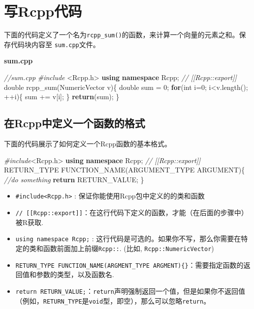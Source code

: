 \documentclass[]{ctexbook}
\newenvironment{Shaded}{\begin{snugshade}}{\end{snugshade}}
\newcommand{\KeywordTok}[1]{\textcolor[rgb]{0.13,0.29,0.53}{\textbf{#1}}}
\newcommand{\DataTypeTok}[1]{\textcolor[rgb]{0.13,0.29,0.53}{#1}}
\newcommand{\DecValTok}[1]{\textcolor[rgb]{0.00,0.00,0.81}{#1}}
\newcommand{\ImportTok}[1]{#1}
\newcommand{\CommentTok}[1]{\textcolor[rgb]{0.56,0.35,0.01}{\textit{#1}}}
\newcommand{\ControlFlowTok}[1]{\textcolor[rgb]{0.13,0.29,0.53}{\textbf{#1}}}
\newcommand{\PreprocessorTok}[1]{\textcolor[rgb]{0.56,0.35,0.01}{\textit{#1}}}
\newcommand{\NormalTok}[1]{#1}
\begin{document}
\section{写Rcpp代码}\label{WriteRcppCode}

下面的代码定义了一个名为\texttt{rcpp\_sum()}的函数，来计算一个向量的元素之和。保存代码块内容至
\texttt{sum.cpp}文件。

\textbf{sum.cpp}

\begin{Shaded}
\begin{Highlighting}[]
\CommentTok{//sum.cpp}
\PreprocessorTok{#include }\ImportTok{<Rcpp.h>}
\KeywordTok{using} \KeywordTok{namespace}\NormalTok{ Rcpp;}
\CommentTok{// [[Rcpp::export]]}
\DataTypeTok{double}\NormalTok{ rcpp_sum(NumericVector v)\{}
    \DataTypeTok{double}\NormalTok{ sum = }\DecValTok{0}\NormalTok{;}
    \ControlFlowTok{for}\NormalTok{(}\DataTypeTok{int}\NormalTok{ i=}\DecValTok{0}\NormalTok{; i<v.length(); ++i)\{}
\NormalTok{        sum += v[i];}
\NormalTok{    \}}
    \ControlFlowTok{return}\NormalTok{(sum);}
\NormalTok{\}}
\end{Highlighting}
\end{Shaded}

\subsection{在Rcpp中定义一个函数的格式}\label{formatForFunction}

下面的代码展示了如何定义一个Rcpp函数的基本格式。

\begin{Shaded}
\begin{Highlighting}[]
\PreprocessorTok{#include}\ImportTok{<Rcpp.h>}
\KeywordTok{using} \KeywordTok{namespace}\NormalTok{ Rcpp;}
\CommentTok{// [[Rcpp::export]]}
\NormalTok{RETURN_TYPE FUNCTION_NAME(ARGUMENT_TYPE ARGUMENT)\{}
    \CommentTok{//do something}
    \ControlFlowTok{return}\NormalTok{ RETURN_VALUE;}
\NormalTok{\}}
\end{Highlighting}
\end{Shaded}

\begin{itemize}
\item
  \texttt{\#include\textless{}Rcpp.h\textgreater{}} :
  保证你能使用Rcpp包中定义的的类和函数
\item
  \texttt{//\ {[}{[}Rcpp::export{]}{]}}：在这行代码下定义的函数，才能（在后面的步骤中）被R获取.
\item
  \texttt{using\ namespace\ Rcpp;} :
  这行代码是可选的。如果你不写，那么你需要在特定的类和函数前面加上前缀\texttt{Rcpp::}.
  (比如, \texttt{Rcpp::NumericVector})
\item
  \texttt{RETURN\_TYPE\ FUNCTION\_NAME(ARGMENT\_TYPE\ ARGMENT)\{\}}：需要指定函数的返回值和参数的类型，以及函数名.
\item
  \texttt{return\ RETURN\_VALUE;}：\texttt{return}声明强制返回一个值，但是如果你不返回值（例如，\texttt{RETURN\_TYPE}是\texttt{void}型，即空），那么可以忽略\texttt{return}。
\end{itemize}
\end{document}
